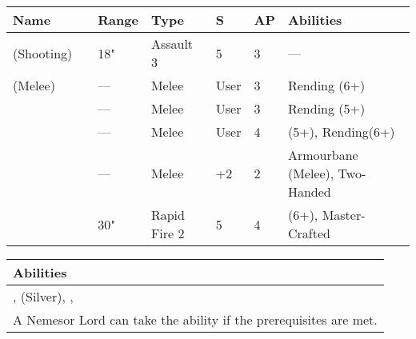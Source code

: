 \noindent
\begin{tabular}{||m{110pt} m{30pt} m{31pt} m{55pt} m{12pt} m{12pt} m{210pt}||}
	\hline
	Name & & Range & Type & S & AP & Abilities \\
	\hline
	\quickref{Staff of Light} (Shooting) & & 18" & Assault 3 & 5 & 3 & — \\
	\quickref{Staff of Light} (Melee) & & — & Melee & User & 3 & Rending (6+) \\
	\quickref{Hyperphase Sword} &  & — & Melee & User & 3 & Rending (5+) \\
	\quickref{Voidblade} &  & — & Melee & User & 4 & \quickref{Entropic Strike} (5+), Rending(6+) \\
	\quickref{Warscythe} &  & — & Melee & +2 & 2 & Armourbane (Melee), Two-Handed \\
	\quickref{Relic Gauss Blaster} & & 30" & Rapid Fire 2 & 5 & 4 & \quickref{Gauss} (6+), Master-Crafted \\
	\hline
\end{tabular}

\noindent
\begin{tabular}{||m{532pt}||}
	\hline
	Abilities \\
	\hline
	\quickref{Command Protocols}, \quickref{Nodal Command}(Silver), \quickref{Living Metal}, \quickref{Reanimation Protocols} \\
	A Nemesor Lord can take the \quickref{Decurion Nemesor} ability if the prerequisites are met. \\
	\hline
\end{tabular}



\newpage
{}

